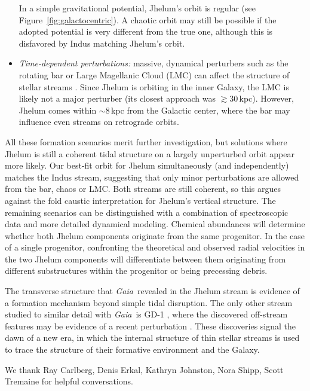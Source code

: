 \documentclass[twocolumn]{aastex62}
\newcommand{\gaia}{\textsl{Gaia}}
\begin{document}
\begin{itemize}
{ In a simple gravitational potential, Jhelum's orbit is regular (see Figure~\ref{fig:galactocentric}).
 A chaotic orbit may still be possible if the adopted potential is very different from the true one, although this is disfavored by Indus matching Jhelum's orbit.
 }
 \item{\emph{Time-dependent perturbations:} massive, dynamical perturbers such as the rotating bar or Large Magellanic Cloud (LMC) can affect the structure of stellar streams \citep[e.g.,][]{pearson2017, erkal2019}.
 Since Jhelum is orbiting in the inner Galaxy, the LMC is likely not a major perturber (its closest approach was $\gtrsim30$\,kpc).
 However, Jhelum comes within $\sim8\,$kpc from the Galactic center, where the bar may influence even streams on retrograde orbits.
 }
\end{itemize}

All these formation scenarios merit further investigation, but solutions where Jhelum is still a coherent tidal structure on a largely unperturbed orbit appear more likely.
Our best-fit orbit for Jhelum simultaneously (and independently) matches the Indus stream, suggesting that only minor perturbations are allowed from the bar, chaos or LMC.
Both streams are still coherent, so this argues against the fold caustic interpretation for Jhelum's vertical structure.
The remaining scenarios can be distinguished with a combination of spectroscopic data and more detailed dynamical modeling.
Chemical abundances will determine whether both Jhelum components originate from the same progenitor.
In the case of a single progenitor, confronting the theoretical and observed radial velocities in the two Jhelum components will differentiate between them originating from different substructures within the progenitor or being precessing debris.

The transverse structure that \gaia\ revealed in the Jhelum stream is evidence of a formation mechanism beyond simple tidal disruption.
The only other stream studied to similar detail with \gaia\ is GD-1 \citep{pwb}, where the discovered off-stream features may be evidence of a recent perturbation \citep{bonaca2018}.
These discoveries signal the dawn of a new era, in which the internal structure of thin stellar streams is used to trace the structure of their formative environment and the Galaxy.

\vspace{0.5cm}
\acknowledgements
We thank Ray Carlberg, Denis Erkal, Kathryn Johnston, Nora Shipp, Scott Tremaine for helpful conversations.
\end{document}
